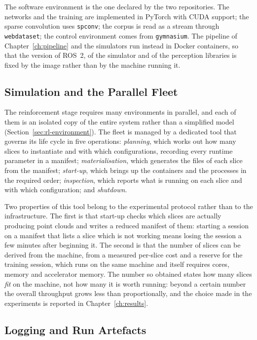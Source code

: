 The software environment is the one declared by the two repositories. The
networks and the training are implemented in PyTorch with CUDA support; the
sparse convolution uses \texttt{spconv}; the corpus is read as a stream through
\texttt{webdataset}; the control environment comes from \texttt{gymnasium}. The
pipeline of Chapter~\ref{ch:pipeline} and the simulators run instead in Docker
containers, so that the version of ROS~2, of the simulator and of the perception
libraries is fixed by the image rather than by the machine running it.

\subsection{Simulation and the Parallel Fleet}

The reinforcement stage requires many environments in parallel, and each of them
is an isolated copy of the entire system rather than a simplified model
(Section~\ref{sec:rl-environment}). The fleet is managed by a dedicated tool
that governs its life cycle in five operations: \emph{planning}, which works out
how many slices to instantiate and with which configurations, recording every
runtime parameter in a manifest; \emph{materialisation}, which generates the
files of each slice from the manifest; \emph{start-up}, which brings up the
containers and the processes in the required order; \emph{inspection}, which
reports what is running on each slice and with which configuration; and
\emph{shutdown}.

Two properties of this tool belong to the experimental protocol rather than to
the infrastructure. The first is that start-up checks which slices are actually
producing point clouds and writes a reduced manifest of them: starting a session
on a manifest that lists a slice which is not working means losing the session a
few minutes after beginning it. The second is that the number of slices can be
derived from the machine, from a measured per-slice cost and a reserve for the
training session, which runs on the same machine and itself requires cores,
memory and accelerator memory. The number so obtained states how many slices
\emph{fit} on the machine, not how many it is worth running: beyond a certain
number the overall throughput grows less than proportionally, and the choice
made in the experiments is reported in Chapter~\ref{ch:results}.

\subsection{Logging and Run Artefacts}

